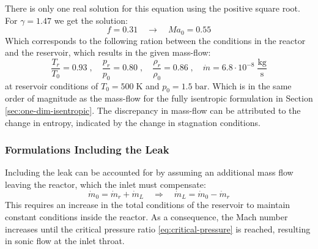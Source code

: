 	There is only one real solution for this equation using the positive square root.
	For $\gamma = 1.47$ we get the solution:
	$$
		f = 0.31
			\quad \to \quad
		Ma_0 = 0.55
	$$
	Which corresponds to the following ration between the conditions in the reactor and the reservoir, which results in the given mass-flow:
	$$
		\frac{T_r}{T_0} = 0.93\;, \quad \frac{p_r}{p_0} = 0.80\;, \quad \frac{\rho_r}{\rho_0} = 0.86\;, \quad
		\dot{m} = 6.8 \cdot 10^{-8} \; \frac{\text{kg}}{\text{s}}
	$$
	at reservoir conditions of $T_0 = 500\;\text{K}$ and $p_0 = 1.5\;\text{bar}$.
	Which is in the same order of magnitude as the mass-flow for the fully isentropic formulation in Section \ref{sec:one-dim-isentropic}.
	The discrepancy in mass-flow can be attributed to the change in entropy, indicated by the change in stagnation conditions.
	\newpage

\subsubsection*{Formulations Including the Leak}
	Including the leak can be accounted for by assuming an additional mass flow leaving the reactor, which the inlet must compensate:
	\begin{equation}
	    \dot{m}_0 = \dot{m}_r + \dot{m}_L 
	    \quad \Rightarrow \quad 
	    \dot{m}_L = \dot{m}_0 - \dot{m}_r \label{eq:massflow-leak}
	\end{equation}
	This requires an increase in the total conditions of the reservoir to maintain constant conditions inside the reactor.
	As a consequence, the Mach number increases until the critical pressure ratio \eqref{eq:critical-pressure} is reached, resulting in sonic flow at the inlet throat.

